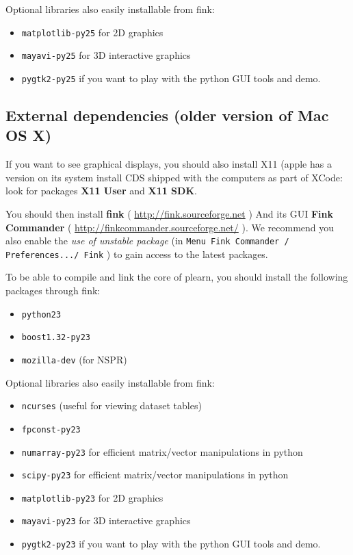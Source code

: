 \documentclass[11pt]{book}
\begin{document}
Optional libraries also easily installable from fink:
\begin{itemize}
\item {\tt matplotlib-py25} for 2D graphics
\item {\tt mayavi-py25} for 3D interactive graphics
\item {\tt pygtk2-py25} if you want to play with the
  python GUI tools and demo.
\end{itemize}



\subsection{External dependencies (older version of Mac OS X)}
If you want to see graphical displays, you should also install X11 (apple
has a version on its system install CDS shipped with the computers as part
of XCode: look for packages {\bf X11 User} and {\bf X11 SDK}.

You should then install {\bf fink} ( \url{http://fink.sourceforge.net} )
And its GUI {\bf Fink Commander} ( \url{http://finkcommander.sourceforge.net/} ).
We recommend you also enable the {\em use of unstable package} (in {\tt Menu Fink
Commander / Preferences.../ Fink} ) to gain access to the latest packages.

To be able to compile and link the core of plearn, you should install the
following packages through fink:
\begin{itemize}
\item {\tt python23}
\item {\tt boost1.32-py23}
\item {\tt mozilla-dev} (for NSPR)
\end{itemize}

Optional libraries also easily installable from fink:
\begin{itemize}
\item {\tt ncurses}  (useful for viewing dataset tables)
\item {\tt fpconst-py23}
\item {\tt numarray-py23} for efficient matrix/vector manipulations in python
\item {\tt scipy-py23} for efficient matrix/vector manipulations in python
\item {\tt matplotlib-py23} for 2D graphics
\item {\tt mayavi-py23} for 3D interactive graphics
\item {\tt pygtk2-py23} if you want to play with the
  python GUI tools and demo.
\end{itemize}
\end{document}
